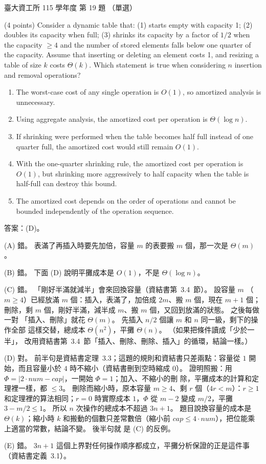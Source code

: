 \begin{pastexam}[label={px:ntu-115-dsa-19}]{臺大資工所 115 學年度 第 19 題}
（單選）

(4 points) Consider a dynamic table that: (1) starts empty with capacity 1; (2) doubles its capacity when full; (3) shrinks its capacity by a factor of $1/2$ when the capacity $\ge 4$ and the number of stored elements falls below one quarter of the capacity. Assume that inserting or deleting an element costs 1, and resizing a table of size $k$ costs $\Theta(k)$. Which statement is true when considering $n$ insertion and removal operations?
\begin{enumerate}[label=(\Alph*)]
\item The worst-case cost of any single operation is $O(1)$, so amortized analysis is unnecessary.
\item Using aggregate analysis, the amortized cost per operation is $\Theta(\log n)$.
\item If shrinking were performed when the table becomes half full instead of one quarter full, the amortized cost would still remain $O(1)$.
\item With the one-quarter shrinking rule, the amortized cost per operation is $O(1)$, but shrinking more aggressively to half capacity when the table is half-full can destroy this bound.
\item The amortized cost depends on the order of operations and cannot be bounded independently of the operation sequence.
\end{enumerate}
\end{pastexam}

\begin{pastsoln}
答案：(D)。

(A) 錯。 表滿了再插入時要先加倍，容量 $m$ 的表要搬 $m$ 個，那一次是 $\Theta(m)$。

(B) 錯。 下面 (D) 說明平攤成本是 $O(1)$，不是 $\Theta(\log n)$。

(C) 錯。 「剛好半滿就減半」會來回換容量（資結書第~3.4~節）。 設容量 $m$
（$m \ge 4$）已經放滿 $m$ 個：插入，表滿了，加倍成 $2m$、搬 $m$ 個，現在 $m + 1$ 個；
刪除，剩 $m$ 個，剛好半滿，減半成 $m$、搬 $m$ 個，又回到放滿的狀態。 之後每做一對
「插入、刪除」就花 $\Theta(m)$。 先插入 $n/2$ 個讓 $m$ 和 $n$ 同一級，剩下的操作全部
這樣交替，總成本 $\Theta(n^2)$，平攤 $\Theta(n)$。 （如果把條件讀成「少於一半」，
改用資結書第~3.4~節「插入、刪除、刪除、插入」的循環，結論一樣。）

(D) 對。 前半句是資結書定理~3.3；這題的規則和資結書只差兩點：容量從 $1$
開始，而且容量小於 $4$ 時不縮小（資結書刪到空時縮成 $0$）。 證明照搬：用
$\Phi = |2 \cdot \mathit{num} - \mathit{cap}|$，一開始 $\Phi = 1$；加入、不縮小的刪
除，平攤成本的計算和定理裡一樣，都 $\le 3$。 刪除而縮小時，原本容量 $m \ge 4$、剩
$r$ 個（$4r < m$）：$r \ge 1$ 和定理裡的算法相同；$r = 0$ 時實際成本 $1$，$\Phi$ 從
$m - 2$ 變成 $m/2$，平攤 $3 - m/2 \le 1$。 所以 $n$ 次操作的總成本不超過 $3n + 1$。
題目說換容量的成本是 $\Theta(k)$；縮小時 $k$ 和搬動的個數只差常數倍（縮小前
$\mathit{cap} \le 4 \cdot \mathit{num}$），把位能乘上適當的常數，結論不變。 後半句就
是 (C) 的反例。

(E) 錯。 $3n + 1$ 這個上界對任何操作順序都成立，平攤分析保證的正是這件事
（資結書定義~3.1）。
\end{pastsoln}
